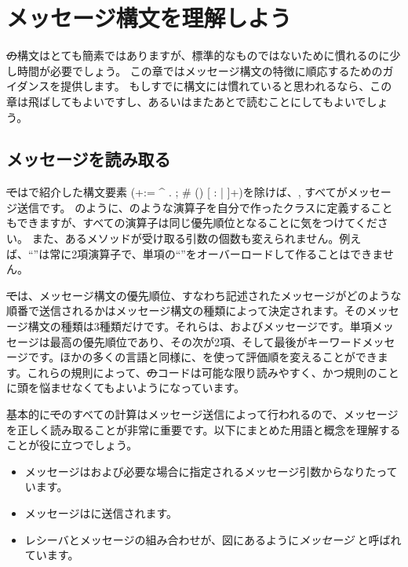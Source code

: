 \documentclass[a4paper,10pt,twoside]{book}
\begin{document}
	\renewcommand{\nnbb}[2]{} %
	\sloppy
\fi
\chapter{メッセージ構文を理解しよう}

\st の構文はとても簡素ではありますが、標準的なものではないために慣れるのに少し時間が必要でしょう。
この章ではメッセージ構文の特徴に順応するためのガイダンスを提供します。
もしすでに構文には慣れていると思われるなら、この章は飛ばしてもよいですし、あるいはまたあとで読むことにしてもよいでしょう。

\section{メッセージを読み取る}

\st ではで紹介した構文要素 (\ct+:= ^ . ; # () {} [ : | ]+)を除けば、, すべてがメッセージ送信です。
のように、\ct{+}のような演算子を自分で作ったクラスに定義することもできますが、すべての演算子は同じ優先順位となることに気をつけてください。
また、あるメソッドが受け取る引数の個数も変えられません。例えば、``\ct{-}''は常に2項演算子で、単項の``\ct{-}''をオーバーロードして作ることはできません。

\st では、メッセージ構文の優先順位、すなわち記述されたメッセージがどのような順番で送信されるかはメッセージ構文の種類によって決定されます。そのメッセージ構文の種類は3種類だけです。それらは、およびメッセージです。単項メッセージは最高の優先順位であり、その次が2項、そして最後がキーワードメッセージです。ほかの多くの言語と同様に、を使って評価順を変えることができます。これらの規則によって、\st のコードは可能な限り読みやすく、かつ規則のことに頭を悩ませなくてもよいようになっています。

基本的に\st でのすべての計算はメッセージ送信によって行われるので、メッセージを正しく読み取ることが非常に重要です。以下にまとめた用語と概念を理解することが役に立つでしょう。

\begin{itemize}
  \item メッセージはおよび必要な場合に指定されるメッセージ引数からなりたっています。
  \item メッセージはに送信されます。
  \item レシーバとメッセージの組み合わせが、図にあるように\emph{メッセージ} と呼ばれています。
\end{itemize}
\end{document}
